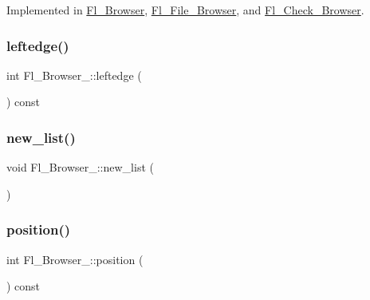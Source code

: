 Implemented in \hyperlink{class_fl___browser_acc938270d35aeb63341f2953a740d7f8}{Fl\+\_\+\+Browser}, \hyperlink{class_fl___file___browser_a93a0cff704c868f0d76031ec56e33c3f}{Fl\+\_\+\+File\+\_\+\+Browser}, and \hyperlink{class_fl___check___browser_ac503f723436bb1f549fa3e6bf2754bb4}{Fl\+\_\+\+Check\+\_\+\+Browser}.

\mbox{\label{class_fl___browser___ab7be86a21c621edb7e5cbea6c30adb44}} 
\subsubsection{\texorpdfstring{leftedge()}{leftedge()}}
{\footnotesize\ttfamily int Fl\+\_\+\+Browser\+\_\+\+::leftedge (\begin{DoxyParamCaption}{ }\end{DoxyParamCaption}) const\hspace{0.3cm}{\ttfamily [protected]}}

\mbox{\label{class_fl___browser___ac1aa2a6bed2109458ab8b701585dca9d}} 
\subsubsection{\texorpdfstring{new\+\_\+list()}{new\_list()}}
{\footnotesize\ttfamily void Fl\+\_\+\+Browser\+\_\+\+::new\+\_\+list (\begin{DoxyParamCaption}{ }\end{DoxyParamCaption})\hspace{0.3cm}{\ttfamily [protected]}}

\mbox{\label{class_fl___browser___aeaf7951678d13027e9b5ca73925bedad}} 
\subsubsection{\texorpdfstring{position()}{position()}\hspace{0.1cm}{\footnotesize\ttfamily [1/2]}}
{\footnotesize\ttfamily int Fl\+\_\+\+Browser\+\_\+\+::position (\begin{DoxyParamCaption}{ }\end{DoxyParamCaption}) const\hspace{0.3cm}{\ttfamily [inline]}}

